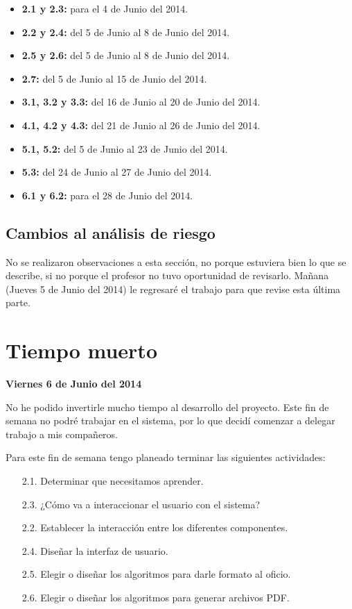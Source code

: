 \documentclass[letterpaper]{article}
\begin{document}
\begin{itemize}
\item \textbf{2.1 y 2.3:} para el 4 de Junio del 2014.
\item \textbf{2.2 y 2.4:} del 5 de Junio al 8 de Junio del 2014.
\item \textbf{2.5 y 2.6:} del 5 de Junio al 8 de Junio del 2014.
\item \textbf{2.7:} del 5 de Junio al 15 de Junio del 2014.
\item \textbf{3.1, 3.2 y 3.3:} del 16 de Junio al 20 de Junio del 2014.
\item \textbf{4.1, 4.2 y 4.3:} del 21 de Junio al 26 de Junio del 2014.
\item \textbf{5.1, 5.2:} del 5 de Junio al 23 de Junio del 2014.
\item \textbf{5.3:} del 24 de Junio al 27 de Junio del 2014.
\item \textbf{6.1 y 6.2:} para el 28 de Junio del 2014.
\end{itemize}

\subsection{Cambios al análisis de riesgo}
No se realizaron observaciones a esta sección, no porque estuviera bien lo que se describe, si no porque el profesor no tuvo oportunidad de revisarlo. Mañana (Jueves 5 de Junio del 2014) le regresaré el trabajo para que revise esta última parte.

\section{Tiempo muerto}
\textbf{Viernes 6 de Junio del 2014}

No he podido invertirle mucho tiempo al desarrollo del proyecto. Este fin de semana no podré trabajar en el sistema, por lo que decidí comenzar a delegar trabajo a mis compañeros.

Para este fin de semana tengo planeado terminar las siguientes actividades:

\begin{itemize}
\item[2.1.] Determinar que necesitamos aprender.
\item[2.3.] ¿Cómo va a interaccionar el usuario con el sistema?
\item[2.2.] Establecer la interacción entre los diferentes componentes.
\item[2.4.] Diseñar la interfaz de usuario.
\item[2.5.] Elegir o diseñar los algoritmos para darle formato al oficio.
\item[2.6.] Elegir o diseñar los algoritmos para generar archivos PDF.
\end{itemize}
\end{document}
